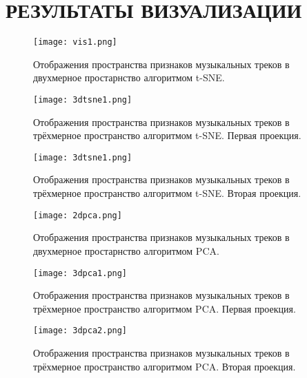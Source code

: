 \section{РЕЗУЛЬТАТЫ ВИЗУАЛИЗАЦИИ}
\label{sec:visualization}

\begin{figure}[h]
\centering
  \texttt{[image: vis1.png]}
  \caption{Отображения пространства  признаков музыкальных треков в двухмерное простарнство алгоритмом t-SNE.}
  \label{fig:results:2dtsne}
\end{figure}

\begin{figure}[h]
\centering
  \texttt{[image: 3dtsne1.png]}
  \caption{Отображения пространства  признаков музыкальных треков в трёхмерное пространство алгоритмом t-SNE. Первая проекция. }
  \label{fig:results:2dtsne}
\end{figure}


\begin{figure}[h]
\centering
  \texttt{[image: 3dtsne1.png]}
  \caption{Отображения пространства  признаков музыкальных треков в трёхмерное пространство алгоритмом t-SNE. Вторая проекция. }
  \label{fig:results:2dtsne}
\end{figure}


\begin{figure}[h]
\centering
  \texttt{[image: 2dpca.png]}
  \caption{Отображения пространства  признаков музыкальных треков в двухмерное простарнство алгоритмом PCA.}
  \label{fig:results:2dtsne}
\end{figure}

\begin{figure}[h]
\centering
  \texttt{[image: 3dpca1.png]}
  \caption{Отображения пространства  признаков музыкальных треков в трёхмерное пространство алгоритмом PCA. Первая проекция. }
  \label{fig:results:2dtsne}
\end{figure}


\begin{figure}[h]
\centering
  \texttt{[image: 3dpca2.png]}
  \caption{Отображения пространства  признаков музыкальных треков в трёхмерное пространство алгоритмом PCA. Вторая проекция. }
  \label{fig:results:2dtsne}
\end{figure}
